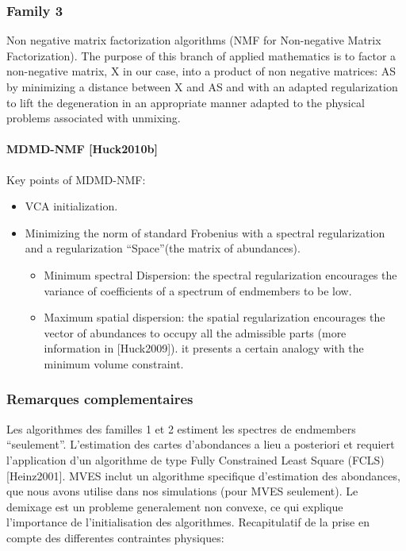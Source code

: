 \subsubsection{Family 3}
Non negative matrix factorization algorithms (NMF for Non-negative Matrix Factorization). The purpose of this
branch of applied mathematics is to factor a non-negative matrix, X in our case, into a product of non negative matrices: AS by minimizing a distance between X and AS and
with an adapted regularization to lift the degeneration in an appropriate manner adapted to the physical problems associated with unmixing.

\paragraph{MDMD-NMF [Huck2010b]} 
Key points of MDMD-NMF:
\begin{itemize}
\item {VCA initialization.}
\item {Minimizing the norm of standard
Frobenius with a spectral regularization and a regularization ``Space''(the matrix of abundances).}
\begin{itemize}
\item {Minimum spectral
Dispersion: the spectral regularization encourages the  variance of 
coefficients of a spectrum of endmembers to be low.}
\item {Maximum spatial dispersion: the spatial regularization
  encourages the vector of abundances to occupy all the admissible parts (more information in [Huck2009]). it
  presents a certain analogy with the minimum volume constraint.}
\end{itemize}
\end{itemize}
 
 
  

\subsubsection{Remarques complementaires}
Les algorithmes des familles 1 et 2 estiment les spectres de
endmembers ``seulement''. L'estimation des cartes d'abondances a lieu
a posteriori et requiert l'application d'un algorithme de type Fully
Constrained Least Square (FCLS) [Heinz2001]. MVES inclut un algorithme
specifique d'estimation des abondances, que nous avons utilise dans
nos simulations (pour MVES seulement).  
Le demixage est un probleme generalement non convexe, ce
qui explique l'importance de l'initialisation des algorithmes.
Recapitulatif de la prise en compte des differentes contraintes
physiques:


